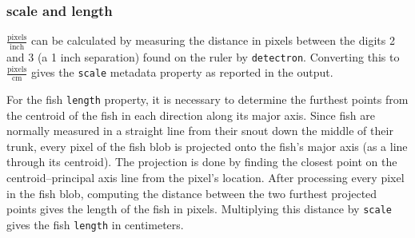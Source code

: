 \documentclass[conference]{IEEEtran}
\begin{document}
\subsubsection{scale and length}
\(\frac{\mathrm{pixels}}{\mathrm{inch}}\) can be calculated by measuring the distance in pixels between the digits 2 and 3 (a 1 inch separation) found on the ruler by \verb|detectron|. Converting this to \(\frac{\mathrm{pixels}}{\mathrm{cm}}\) gives the \verb|scale| metadata property as reported in the output.

For the fish \verb|length| property, it is necessary to determine the furthest points from the centroid of the fish in each direction along its major
axis. Since fish are normally measured in a straight line from their snout down the middle of their trunk, every pixel of the fish blob is projected
onto the fish's major axis (as a line through its centroid).
The projection is done by finding the closest point on the
centroid--principal axis line from the pixel's location.
After processing every pixel in the fish blob, computing the distance
between the two furthest projected points gives the length of the fish in pixels. Multiplying this distance by \verb|scale| gives the fish \verb|length| in centimeters.

\end{document}
